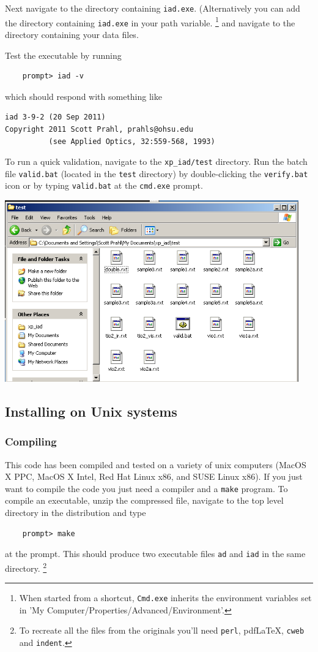 \documentclass{article}
\newcommand\pdflatex{pdf\LaTeX}
\newcommand\iadprog{\texttt{iad}}
\begin{document}
Next navigate to the directory containing \texttt{iad.exe}.  
(Alternatively you 
can add the directory containing \texttt{iad.exe} in your path variable.%
\footnote{
When started from a shortcut, \texttt{Cmd.exe} inherits the environment variables set in 
'My Computer/Properties/Advanced/Environment'.} and
navigate to the directory containing your data files.

Test the executable by running
\begin{verbatim}
    prompt> iad -v
\end{verbatim}
which should respond with something like
\begin{verbatim}
iad 3-9-2 (20 Sep 2011)
Copyright 2011 Scott Prahl, prahls@ohsu.edu
          (see Applied Optics, 32:559-568, 1993)
\end{verbatim}

To run a quick validation, navigate to the \texttt{xp\_iad/test} directory.  Run the
batch file \texttt{valid.bat} (located in the \texttt{test} directory) by
double-clicking the \texttt{verify.bat} icon or by typing \texttt{valid.bat} at
the \texttt{cmd.exe} prompt.
\begin{center}
\includegraphics[width=5in]{valid.png}
\end{center}

\subsection{Installing on Unix systems}

\subsubsection{Compiling}

This code has been compiled and tested on a variety of unix computers (MacOS X PPC, MacOS X Intel,
Red Hat Linux x86, and SUSE Linux x86).  
If you just want to compile the code you just need a compiler and a \texttt{make} program.
To compile an executable,  unzip the compressed file, navigate to the top level directory in the distribution and type
\begin{verbatim}
    prompt> make
\end{verbatim}
at the prompt.  This should produce two executable files \texttt{ad} and \iadprog{} in the 
same directory.%
\footnote{To recreate all the files
from the originals you'll need \texttt{perl}, \pdflatex{}, \texttt{cweb} and \texttt{indent}.}
\end{document}
